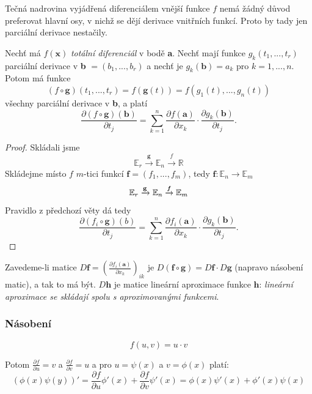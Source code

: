 \documentclass[../main.tex]{subfiles}
\begin{document}
\begin{intuition}
	Tečná nadrovina vyjádřená diferenciálem vnější funkce $f$ nemá žádný důvod preferovat hlavní osy, v nichž se 
	dějí derivace vnitřních funkcí. Proto by tady jen parciální derivace nestačily.
\end{intuition}

\begin{theorem}
	Nechť má $f(\textbf{x})$ \textit{totální diferenciál} v bodě \textbf{a}. Nechť mají funkce $g_k(t_1,...,t_r)$ parciální 
	derivace v \textbf{b} $= (b_1,...,b_r)$ a nechť je $g_k(\textbf{b}) = a_k$ pro $k = 1,...,n.$ Potom má funkce
	\[(f\circ \textbf{g})(t_1,...,t_r) = f(\textbf{g}(t)) = f(g_1(t),...,g_n(t))\]
	všechny parciální derivace v \textbf{b}, a platí 
	\[\frac{\partial (f \circ \textbf{g})(\textbf{b})}{\partial t_j} = \sum^n_{k=1}\frac{\partial f(\textbf{a})}{\partial x_k}
	\cdot \frac{\partial g_k(\textbf{b})}{\partial t_j}.\]
\end{theorem}

\begin{proof}
	Skládali jsme
	\[\mathbb{E}_r \xrightarrow{\mathbf{g}} \mathbb{E}_n \xrightarrow{\textit{f}} \mathbb{R} \]
	Skládejme místo $f$ $m$-tici funkcí
	$\mathbf{f} = (f_1,...,f_m)$, tedy $\mathbf{f}: \mathbb{E}_n \rightarrow \mathbb{E}_m$
	\[\mathbb{E}_r \xrightarrow{\mathbf{g}} \mathbb{E}_n \xrightarrow{\textit{\textbf{f}}} \mathbb{E}_m \]
	Pravidlo z předchozí věty dá tedy
	\[\frac{\partial (f_i \circ \mathbf{g})(b)}{\partial t_j} = \sum^n_{k=1} \frac{\partial f_i(\mathbf{a})}{\partial x_k}
	\cdot \frac{\partial g_k(\mathbf{b})}{\partial t_j}.\]
\end{proof}

\begin{remark}
	Zavedeme-li matice $D\mathbf{f} = \left(\frac{\partial f_i(\mathbf{a})}{\partial x_k}\right)_{ik}$ je 
	$D(\mathbf{f}\circ \mathbf{g}) = D\mathbf{f}\cdot D\mathbf{g}$ (napravo násobení matic), a tak to má být. $D\mathbf{h}$ je matice lineární aproximace 
	funkce $\mathbf{h}$: \textit{lineární aproximace se skládají spolu s aproximovanými funkcemi}.
\end{remark}

\subsubsection{Násobení}
\[ f(u,v) = u \cdot v \]

Potom $ \frac{\partial f}{\partial u} = v $ a $ \frac{\partial f}{\partial v} = u $
a pro $u = \psi (x)$ a $ v = \phi (x) $ platí:
\[ (\phi (x) \psi (y))' =
\frac{\partial f}{\partial u} \phi '(x) + \frac{\partial f}{\partial v} \psi '(x) = 
\phi (x)\psi '(x) + \phi '(x)\psi (x)  \]
\end{document}
